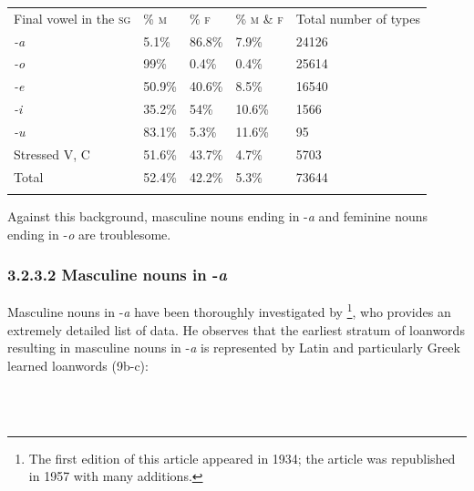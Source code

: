 \documentclass[output=paper]{langscibook}
\begin{document}
\begin{stylelsTable}%
\begin{table}
\caption{Singular ending and gender value of Italian nouns}
\label{tab:key:12}
\end{table}\end{stylelsTable}


\begin{tabularx}{\textwidth}{XXXXX}

\lsptoprule

Final vowel in the \textsc{sg} & \% \textsc{m} & \% \textsc{f}  & \% \textsc{m} \textsc{\&} \textsc{f} & Total number of types\\
\textit{{}-a} & 5.1\% & 86.8\% & 7.9\% & 24126\\
\textit{{}-o} & 99\% & 0.4\% & 0.4\% & 25614\\
\textit{{}-e} & 50.9\% & 40.6\% & 8.5\% & 16540\\
\textit{{}-i} & 35.2\% & 54\% & 10.6\% & 1566\\
\textit{{}-u} & 83.1\% & 5.3\% & 11.6\% & 95\\
Stressed V, C & 51.6\% & 43.7\% & 4.7\% & 5703\\
Total & 52.4\% & 42.2\% & 5.3\% & 73644\\
\lspbottomrule
\end{tabularx}
\begin{stylelsTable}
Against this background, masculine nouns ending in \nobreakdash-\textit{a} and feminine nouns ending in \nobreakdash-\textit{o} are troublesome.
\end{stylelsTable}

\subsubsection{3.2.3.2  Masculine nouns in \nobreakdash-\textit{a}}

Masculine nouns in \nobreakdash-\textit{a} have been thoroughly investigated by \citet{Migliorini1957}\footnote{The first edition of this article appeared in 1934; the article was republished in 1957 with many additions.}, who provides an extremely detailed list of data. He observes that the earliest stratum of loanwords resulting in masculine nouns in \nobreakdash-\textit{a} is represented by Latin  and particularly Greek learned loanwords (9b-c):

\ea%
    \label{ex:key:9}
    \gll \\
         \\
    \glt
    \z %
\end{document}
